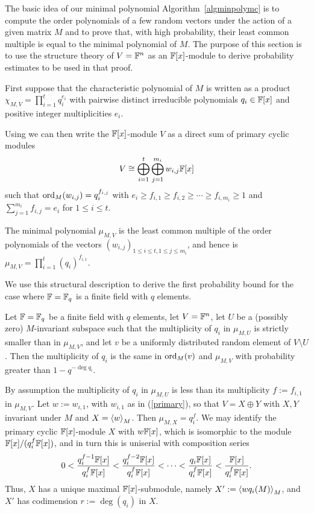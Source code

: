 The basic idea of our minimal polynomial Algorithm~\ref{algminpolymc}
is to compute the order polynomials of a few
random vectors under the action of a given matrix $M$ and to prove that, 
with high probability, their least common multiple is
equal to the minimal polynomial of $M$.
The purpose of this section is to use the structure theory 
of $V = \mathbb{F}^n$ as an $\mathbb{F}[x]$-module to derive probability
estimates to be used in that proof.

First suppose that the characteristic polynomial of $M$ is written as a product
$\chi_{M,V} = \prod_{i=1}^t q_i^{e_i}$ with pairwise distinct
irreducible polynomials $q_i \in \mathbb{F}[x]$ and positive integer
multiplicities $e_i$.

Using \cite[Theorem 3.12]{Jacob1} we can then write the $\mathbb{F}[x]$-module $V$
as a direct sum of primary cyclic modules
\begin{equation} \label{primary}
V \cong \bigoplus_{i=1}^t \bigoplus_{j=1}^{m_i} w_{i,j} \F[x] 
\end{equation}
such that $\mathrm{ord}_M(w_{i,j}) = q_i^{f_{i,j}}$ with
$e_i \ge f_{i,1} \ge f_{i,2} \ge \cdots \ge f_{i,m_i} \ge 1$
and $\sum_{j=1}^{m_i} f_{i,j}=e_i$ for $1 \le i \le t$.

The minimal polynomial $\mu_{M,V}$ is the least
common multiple of the order polynomials of the vectors 
$(w_{i,j})_{1 \le i \le t, 1 \le j \le m_i}$, and hence is 
$\mu_{M,V} = \prod_{i=1}^t (q_i)^{f_{i,1}}$.

We use this structural description to derive the
first probability bound for the case where $\mathbb{F} = \mathbb{F}_q$ is a finite field
with $q$ elements.

\begin{Prop}
\label{ProbOneMult}

Let $\mathbb{F} = \mathbb{F}_q$ be a finite field with $q$ elements, let $V=\mathbb{F}^n$, let
$U$ be a (possibly zero) $M$-invariant subspace such that the multiplicity of
$q_i$ in $\mu_{M,U}$ is strictly smaller than in $\mu_{M,V}$, and let 
$v$ be a uniformly distributed random element of $V\setminus U$. Then 
the multiplicity of $q_i$ is the same in $\mathrm{ord}_M(v)$ and $\mu_{M,V}$ 
with probability greater than
$1-q^{-\deg q_i}$.
\end{Prop}
\proofbeg
By assumption the multiplicity of $q_i$ in $\mu_{M,U}$ 
is less than its multiplicity $f:=f_{i,1}$ in $\mu_{M,V}$. 
Let $w:=w_{i,1}$, with $w_{i,1}$ as in (\ref{primary}), so that $V=X\oplus Y$ with
$X, Y$ invariant under $M$ and $X=\left< w\right>_M$. Then $\mu_{M,X}=
q_i^{f}$. We may identify the primary cyclic $\mathbb{F}[x]$-module 
$X$ with  $w\mathbb{F}[x]$, which is
isomorphic to the module $\mathbb{F}[x]/(q_i^{f}\mathbb{F}[x])$,
and in turn this is uniserial with composition series
\[ 
0 <   \frac{q_i^{f-1}\mathbb{F}[x]}{q_i^{f}\mathbb{F}[x]}
     <   \frac{q_i^{f-2}\mathbb{F}[x]}{q_i^{f}\mathbb{F}[x]} <
\cdots <  \frac{q_i\mathbb{F}[x]}{q_i^{f}\mathbb{F}[x]} 
       < \frac{\mathbb{F}[x]}{q_i^{f}\mathbb{F}[x]}. 
\]
Thus, $X$ has a unique maximal $\mathbb{F}[x]$-submodule, namely  $X':=\left< w q_i(M)\right>_M$,
and $X'$ has codimension $r:=\deg(q_i)$ in $X$. 

